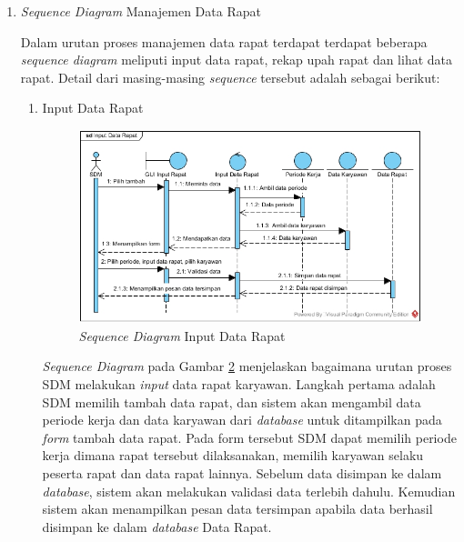 \begin{enumerate}
\begin{figure}[H]
            		    \caption{\emph{Sequence Diagram} Input Data Periode Kerja}
            		    \label{sequence_input_periode}
            		\end{figure}
            		\emph{Sequence Diagram} pada Gambar \ref{sequence_input_periode} menjelaskan bagaimana urutan proses SDM melakukan \emph{input} data periode kerja. SDM memilih tambah data, dan sistem akan menampilkan \emph{form input} data. Kemudian SDM akan mengisi data periode kerja pada \emph{form} tersebut. Sistem akan melakukan validasi data terlebih dahulu sebelum disimpan ke dalam \emph{database} Periode Kerja. Sistem akan menampilkan pesan data tersimpan apabila data berhasil disimpan. \newpage
            	\item \emph{Sequence Diagram} Manajemen Data Rapat
            	
            	Dalam urutan proses manajemen data rapat terdapat terdapat beberapa \emph{sequence diagram} meliputi input data rapat, rekap upah rapat dan lihat data rapat. Detail dari masing-masing \emph{sequence} tersebut adalah sebagai berikut:
            	\begin{enumerate}[label=\alph*.]
            	    \itemsep0em
            	    \item Input Data Rapat
            	    \begin{figure}[H]
            		    \centering
            		    \includegraphics[width=14cm]{gambar/sequence/input-data-rapat}
            		    \caption{\emph{Sequence Diagram} Input Data Rapat}
            		    \label{sequence_input_rapat}
            		\end{figure}
            		\emph{Sequence Diagram} pada Gambar \ref{sequence_input_rapat} menjelaskan bagaimana urutan proses SDM melakukan \emph{input} data rapat karyawan. Langkah pertama adalah SDM memilih tambah data rapat, dan sistem akan mengambil data periode kerja dan data karyawan dari \emph{database} untuk ditampilkan pada \emph{form} tambah data rapat. Pada form tersebut SDM dapat memilih periode kerja dimana rapat tersebut dilaksanakan, memilih karyawan selaku peserta rapat dan data rapat lainnya. Sebelum data disimpan ke dalam \emph{database}, sistem akan melakukan validasi data terlebih dahulu. Kemudian sistem akan menampilkan pesan data tersimpan apabila data berhasil disimpan ke dalam \emph{database} Data Rapat. \newpage

\end{enumerate}
\end{enumerate}

